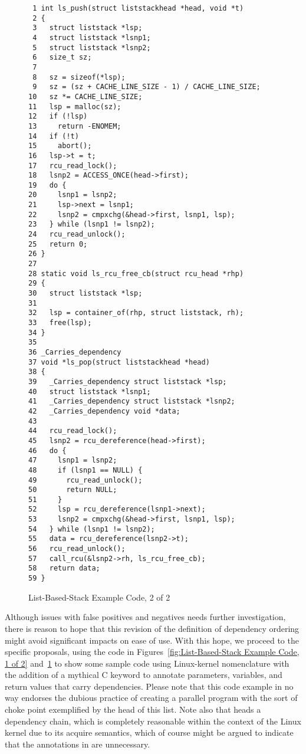 \documentclass[letterpaper,twocolumn,10pt]{article}
\begin{document}
\begin{figure}[tbp]
{ \scriptsize
\begin{verbatim}
 1 int ls_push(struct liststackhead *head, void *t)
 2 {
 3   struct liststack *lsp;
 4   struct liststack *lsnp1;
 5   struct liststack *lsnp2;
 6   size_t sz;
 7 
 8   sz = sizeof(*lsp);
 9   sz = (sz + CACHE_LINE_SIZE - 1) / CACHE_LINE_SIZE;
10   sz *= CACHE_LINE_SIZE;
11   lsp = malloc(sz);
12   if (!lsp)
13     return -ENOMEM;
14   if (!t)
15     abort();
16   lsp->t = t;
17   rcu_read_lock();
18   lsnp2 = ACCESS_ONCE(head->first);
19   do {
20     lsnp1 = lsnp2;
21     lsp->next = lsnp1;
22     lsnp2 = cmpxchg(&head->first, lsnp1, lsp);
23   } while (lsnp1 != lsnp2);
24   rcu_read_unlock();
25   return 0;
26 }
27 
28 static void ls_rcu_free_cb(struct rcu_head *rhp)
29 {
30   struct liststack *lsp;
31 
32   lsp = container_of(rhp, struct liststack, rh);
33   free(lsp);
34 }
35 
36 _Carries_dependency
37 void *ls_pop(struct liststackhead *head)
38 {
39   _Carries_dependency struct liststack *lsp;
40   struct liststack *lsnp1;
41   _Carries_dependency struct liststack *lsnp2;
42   _Carries_dependency void *data;
43 
44   rcu_read_lock();
45   lsnp2 = rcu_dereference(head->first);
46   do {
47     lsnp1 = lsnp2;
48     if (lsnp1 == NULL) {
49       rcu_read_unlock();
50       return NULL;
51     }
52     lsp = rcu_dereference(lsnp1->next);
53     lsnp2 = cmpxchg(&head->first, lsnp1, lsp);
54   } while (lsnp1 != lsnp2);
55   data = rcu_dereference(lsnp2->t);
56   rcu_read_unlock();
57   call_rcu(&lsnp2->rh, ls_rcu_free_cb);
58   return data;
59 }
\end{verbatim}
}
\caption{List-Based-Stack Example Code, 2 of 2}
\label{fig:List-Based-Stack Example Code, 2 of 2}
\end{figure}

Although issues with false positives and negatives needs further
investigation, there is reason to hope that this revision of the
definition of dependency ordering might avoid significant impacts
on ease of use.
With this hope, we proceed to the specific proposals, using
the code in
Figures~\ref{fig:List-Based-Stack Example Code, 1 of 2}
and~\ref{fig:List-Based-Stack Example Code, 2 of 2}
to show some sample code using Linux-kernel nomenclature with the addition
of a mythical C keyword  to annotate
parameters, variables, and return values that carry dependencies.
Please note that this code example in no way endorses the dubious
practice of creating a parallel program with the sort of choke point
exemplified by the head of this list.
Note also that  heads a dependency chain, which is
completely reasonable within the context of the Linux kernel due
to its acquire semantics, which of course might be argued to
indicate that the annotations in  are unnecessary.
\end{document}

